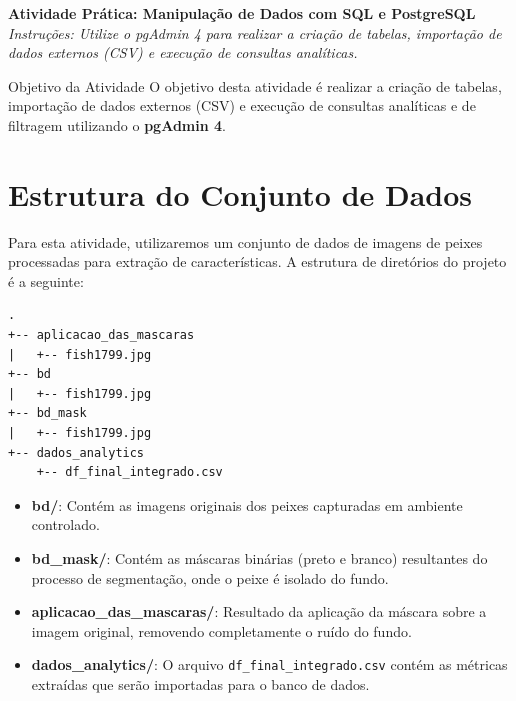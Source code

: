 \documentclass[12pt]{article}
\begin{document}

\vspace*{0.2cm}

\begin{center}
  {\Large \textbf{Atividade Prática: Manipulação de Dados com SQL e PostgreSQL}}\\[0.2cm]
  \textit{Instruções: Utilize o pgAdmin 4 para realizar a criação de tabelas, importação de dados externos (CSV) e execução de consultas analíticas.}
\end{center}

\vspace{0.4cm}

\begin{block}{Objetivo da Atividade}
O objetivo desta atividade é realizar a criação de tabelas, importação de dados externos (CSV) e execução de consultas analíticas e de filtragem utilizando o \textbf{pgAdmin 4}.
\end{block}

\vspace{0.5cm}
  
\section*{Estrutura do Conjunto de Dados}

Para esta atividade, utilizaremos um conjunto de dados de imagens de peixes processadas para extração de características. A estrutura de diretórios do projeto é a seguinte:

\begin{verbatim}
.
+-- aplicacao_das_mascaras
|   +-- fish1799.jpg
+-- bd
|   +-- fish1799.jpg
+-- bd_mask
|   +-- fish1799.jpg
+-- dados_analytics
    +-- df_final_integrado.csv
\end{verbatim}

\begin{itemize}
    \item \textbf{bd/}: Contém as imagens originais dos peixes capturadas em ambiente controlado.
    \item \textbf{bd\_mask/}: Contém as máscaras binárias (preto e branco) resultantes do processo de segmentação, onde o peixe é isolado do fundo.
    \item \textbf{aplicacao\_das\_mascaras/}: Resultado da aplicação da máscara sobre a imagem original, removendo completamente o ruído do fundo.
    \item \textbf{dados\_analytics/}: O arquivo \texttt{df\_final\_integrado.csv} contém as métricas extraídas que serão importadas para o banco de dados.
\end{itemize}
\end{document}
